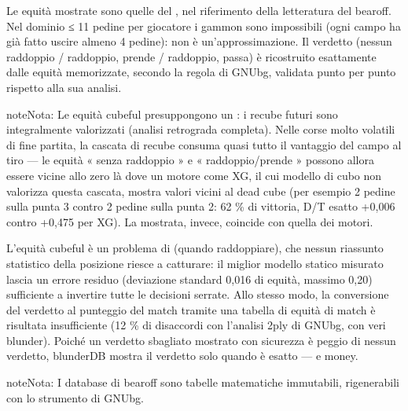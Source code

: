 \documentclass[letterpaper,10pt,italian]{sphinxmanual}
\begin{document}
\sphinxAtStartPar
{} Le equità mostrate sono quelle del , nel riferimento della letteratura del bearoff. Nel dominio ≤ 11 pedine per giocatore i gammon sono impossibili (ogni campo ha già fatto uscire almeno 4 pedine): non è un’approssimazione. Il verdetto (nessun raddoppio / raddoppio, prende / raddoppio, passa) è ricostruito esattamente dalle equità memorizzate, secondo la regola di GNUbg, validata punto per punto rispetto alla sua analisi.

\begin{sphinxadmonition}{note}{Nota:}
\sphinxAtStartPar
Le equità cubeful presuppongono un : i recube futuri sono integralmente valorizzati (analisi retrograda completa). Nelle corse molto volatili di fine partita, la cascata di recube consuma quasi tutto il vantaggio del campo al tiro — le equità « senza raddoppio » e « raddoppio/prende » possono allora essere vicine allo zero là dove un motore come XG, il cui modello di cubo non valorizza questa cascata, mostra valori vicini al dead cube (per esempio 2 pedine sulla punta 3 contro 2 pedine sulla punta 2: 62 \% di vittoria, D/T esatto +0,006 contro +0,475 per XG). La  mostrata, invece, coincide con quella dei motori.
\end{sphinxadmonition}

\sphinxAtStartPar
{} L’equità cubeful è un problema di  (quando raddoppiare), che nessun riassunto statistico della posizione riesce a catturare: il miglior modello statico misurato lascia un errore residuo (deviazione standard 0,016 di equità, massimo 0,20) sufficiente a invertire tutte le decisioni serrate. Allo stesso modo, la conversione del verdetto al punteggio del match tramite una tabella di equità di match è risultata insufficiente (12 \% di disaccordi con l’analisi 2\sphinxhyphen{}ply di GNUbg, con veri blunder). Poiché un verdetto sbagliato mostrato con sicurezza è peggio di nessun verdetto, blunderDB mostra il verdetto solo quando è esatto — e money.

\begin{sphinxadmonition}{note}{Nota:}
\sphinxAtStartPar
I database di bearoff sono tabelle matematiche immutabili, rigenerabili con lo strumento  di GNUbg.
\end{sphinxadmonition}
\end{document}
